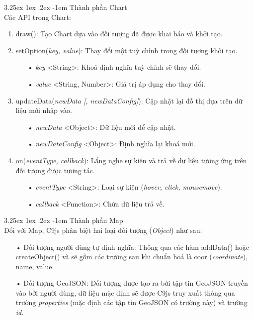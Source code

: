 \documentclass[12pt,a4paper]{article}
\makeatletter
\newcommand{\myparagraph}[1]{\paragraph{#1}\mbox{}\\} %
\renewcommand\paragraph{\@startsection{paragraph}{5}{\z@}%
  {3.25ex \@plus1ex \@minus.2ex}%
  {-1em}%
  {\normalfont\normalsize\bfseries}}
\makeatother
\begin{document}
\myparagraph{Thành phần Chart}
Các API trong Chart:
\begin{enumerate}
\item \textsf{draw():}  Tạo Chart dựa vào đối tượng đã được khai báo và khởi tạo.

\item \textsf{setOption(\textit{key, value})}: Thay đổi một tuỳ chỉnh trong đối tượng khởi tạo.
	\begin{itemize}
		\item[•] \textit{key} <String>: Khoá định nghĩa tuỳ chỉnh sẽ thay đổi.
		\item[•] \textit{value} <String, Number>: Giá trị áp dụng cho thay đổi.
	\end{itemize}
	
\item \textsf{updateData(\textit{newData [, newDataConfig]})}: Cập nhật lại đồ thị dựa trên dữ liệu mới nhập vào.
	\begin{itemize}
		\item[•] \textit{newData} <Object>: Dữ liệu mới để cập nhật.
		\item[•] \textit{newDataConfig } <Object>: Định nghĩa lại khoá mới.
	\end{itemize}
	
\item \textsf{on(\textit{eventType, callback})}: Lắng nghe sự kiện và trả về dữ liệu tương ứng trên đối tượng được tương tác.
	\begin{itemize}
		\item[•] \textit{eventType} <String>: Loại sự kiện (\textit{hover, click, mousemove}).
		\item[•] \textit{callback} <Function>: Chứa dữ liệu trả về.
	\end{itemize}
\end{enumerate}

\myparagraph{Thành phần Map}
Đối với Map, C9js phân biệt hai loại đối tượng (\textit{Object}) như sau: \label{sec:map_api}

\begin{itemize}
\item[•] Đối tượng người dùng tự định nghĩa: Thông qua các hàm \textsf{addData()} hoặc \textsf{createObject()} và sẽ gồm các trường sau khi chuẩn hoá là coor (\textit{coordinate}), name, value.
\item[•] Đối tượng GeoJSON: Đối tượng được tạo ra bởi tập tin GeoJSON truyền vào bởi người dùng, dữ liệu mặc định sẽ được C9js truy xuất thông qua trường \textit{properties} (mặc định các tập tin GeoJSON có trường này) và trường \textit{id}.
\end{itemize}
\end{document}
